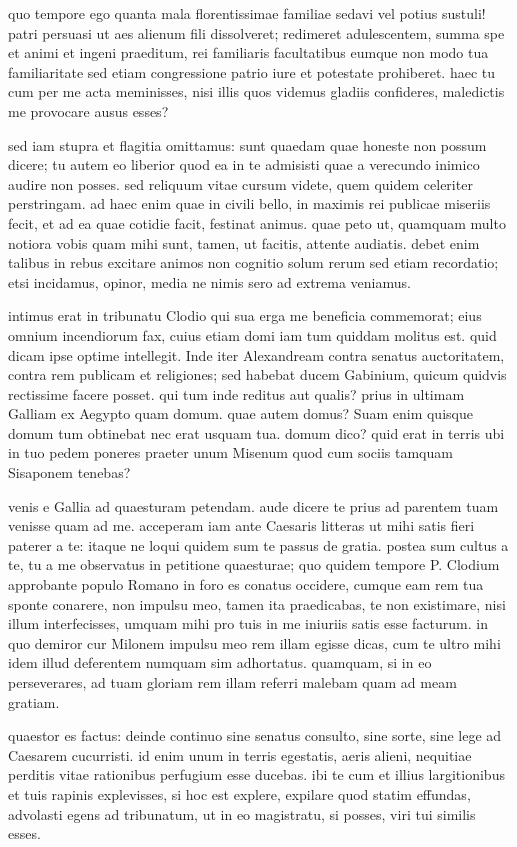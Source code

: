 quo tempore ego quanta mala florentissimae familiae sedavi vel potius sustuli! patri persuasi ut aes alienum fili dissolveret; redimeret adulescentem, summa spe et animi et ingeni praeditum, rei familiaris facultatibus eumque non modo tua familiaritate sed etiam congressione patrio iure et potestate prohiberet. haec tu cum per me acta meminisses, nisi illis quos videmus gladiis confideres, maledictis me provocare ausus esses?

sed iam stupra et flagitia omittamus: sunt quaedam quae honeste non possum dicere; tu autem eo liberior quod ea in te admisisti quae a verecundo inimico audire non posses. sed reliquum vitae cursum videte, quem quidem celeriter perstringam. ad haec enim quae in civili bello, in maximis rei publicae miseriis fecit, et ad ea quae cotidie facit, festinat animus. quae peto ut, quamquam multo notiora vobis quam mihi sunt, tamen, ut facitis, attente audiatis. debet enim talibus in rebus excitare animos non cognitio solum rerum sed etiam recordatio; etsi incidamus, opinor, media ne nimis sero ad extrema veniamus. 

intimus erat in tribunatu Clodio qui sua erga me beneficia commemorat; eius omnium incendiorum fax, cuius etiam domi iam tum quiddam molitus est. quid dicam ipse optime intellegit. Inde iter Alexandream contra senatus auctoritatem, contra rem publicam et religiones; sed habebat ducem Gabinium, quicum quidvis rectissime facere posset. qui tum inde reditus aut qualis? prius in ultimam Galliam ex Aegypto quam domum. quae autem domus? Suam enim quisque domum tum obtinebat nec erat usquam tua. domum dico? quid erat in terris ubi in tuo pedem poneres praeter unum Misenum quod cum sociis tamquam Sisaponem tenebas?

venis e Gallia ad quaesturam petendam. aude dicere te prius ad parentem tuam venisse quam ad me. acceperam iam ante Caesaris litteras ut mihi satis fieri paterer a te: itaque ne loqui quidem sum te passus de gratia. postea sum cultus a te, tu a me observatus in petitione quaesturae; quo quidem tempore P. Clodium approbante populo Romano in foro es conatus occidere, cumque eam rem tua sponte conarere, non impulsu meo, tamen ita praedicabas, te non existimare, nisi illum interfecisses, umquam mihi pro tuis in me iniuriis satis esse facturum. in quo demiror cur Milonem impulsu meo rem illam egisse dicas, cum te ultro mihi idem illud deferentem numquam sim adhortatus. quamquam, si in eo perseverares, ad tuam gloriam rem illam referri malebam quam ad meam gratiam. 

quaestor es factus: deinde continuo sine senatus consulto, sine sorte, sine lege ad Caesarem cucurristi. id enim unum in terris egestatis, aeris alieni, nequitiae perditis vitae rationibus perfugium esse ducebas. ibi te cum et illius largitionibus et tuis rapinis explevisses, si hoc est explere, expilare quod statim effundas, advolasti egens ad tribunatum, ut in eo magistratu, si posses, viri tui similis esses.
